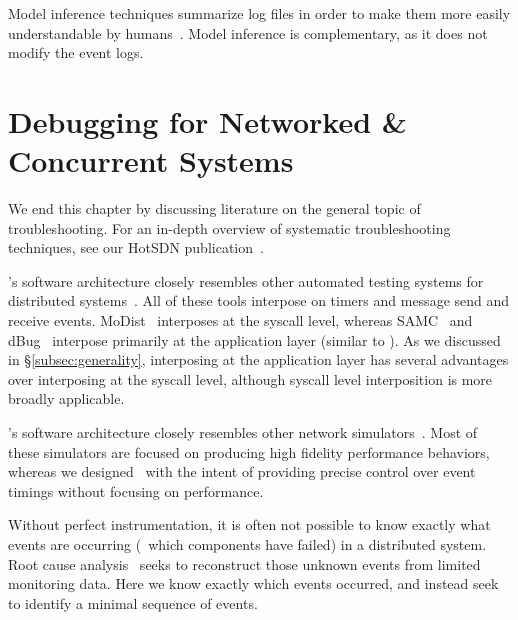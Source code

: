  Model inference techniques summarize log files
in order to make them more easily understandable by
humans~\cite{ernst2001dynamically,synoptic,csight,biermann1972synthesis,lorenzoli2008automatic,lou2010mining}.
Model inference is complementary, as it does not modify the event logs.

\section{Debugging for Networked \& Concurrent Systems}

We end this chapter by discussing
literature on the general topic of troubleshooting. For an in-depth overview of
systematic troubleshooting techniques, see our HotSDN publication~\cite{heller2013leveraging}.


 \sys's
software architecture closely resembles other automated testing systems for
distributed
systems~\cite{lin2009modist,leesatapornwongsa2014samc,simsa2010dbug}. All of
these tools interpose on timers and message send and receive events. MoDist~\cite{lin2009modist}
interposes at the syscall level, whereas SAMC~\cite{leesatapornwongsa2014samc} and dBug~\cite{simsa2010dbug}
interpose primarily at the application layer (similar to \sys). As we discussed in \S\ref{subsec:generality}, interposing
at the application layer has several advantages over interposing at the
syscall level, although syscall level interposition is more broadly applicable.

\projectname's software architecture closely resembles other network
simulators~\cite{handigol2012reproducible,ns-3,Vahdat:2002:SAL:844128.844154}.
Most of these simulators are focused on producing high fidelity performance
behaviors, whereas we designed \projectname~with the intent of providing
precise control over event timings without focusing on performance.

 Without perfect instrumentation,
it is often not possible to know exactly what events are occurring (\eg~which
 components have failed) in a
 distributed system. Root cause analysis~\cite{yemini1996,Kandula:2009:DDE:1592568.1592597}
 seeks to reconstruct those unknown events from limited monitoring data.
 Here we know exactly which events occurred, and instead
 seek to identify a minimal sequence of events.

